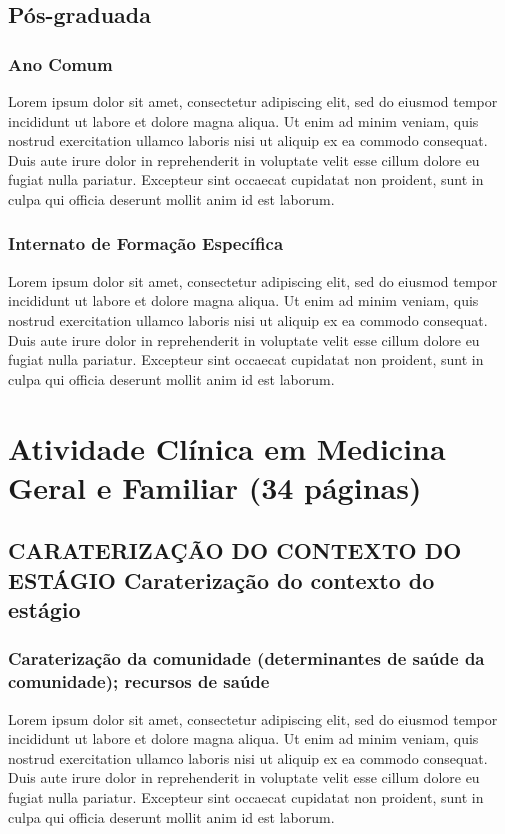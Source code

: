 \documentclass{report}
\begin{document}
\section{Pós-graduada}

\subsection{Ano Comum}
Lorem ipsum dolor sit amet, consectetur adipiscing elit, sed do eiusmod tempor incididunt ut labore et dolore magna aliqua. Ut enim ad minim veniam, quis nostrud exercitation ullamco laboris nisi ut aliquip ex ea commodo consequat. Duis aute irure dolor in reprehenderit in voluptate velit esse cillum dolore eu fugiat nulla pariatur. Excepteur sint occaecat cupidatat non proident, sunt in culpa qui officia deserunt mollit anim id est laborum.

\subsection{Internato de Formação Específica}
Lorem ipsum dolor sit amet, consectetur adipiscing elit, sed do eiusmod tempor incididunt ut labore et dolore magna aliqua. Ut enim ad minim veniam, quis nostrud exercitation ullamco laboris nisi ut aliquip ex ea commodo consequat. Duis aute irure dolor in reprehenderit in voluptate velit esse cillum dolore eu fugiat nulla pariatur. Excepteur sint occaecat cupidatat non proident, sunt in culpa qui officia deserunt mollit anim id est laborum.

\chapter{Atividade Clínica em Medicina Geral e Familiar (34 páginas)}

\section{CARATERIZAÇÃO DO CONTEXTO DO ESTÁGIO Caraterização do contexto do estágio}
\subsection{Caraterização da comunidade (determinantes de saúde da comunidade); recursos de saúde}
Lorem ipsum dolor sit amet, consectetur adipiscing elit, sed do eiusmod tempor incididunt ut labore et dolore magna aliqua. Ut enim ad minim veniam, quis nostrud exercitation ullamco laboris nisi ut aliquip ex ea commodo consequat. Duis aute irure dolor in reprehenderit in voluptate velit esse cillum dolore eu fugiat nulla pariatur. Excepteur sint occaecat cupidatat non proident, sunt in culpa qui officia deserunt mollit anim id est laborum.
\end{document}
